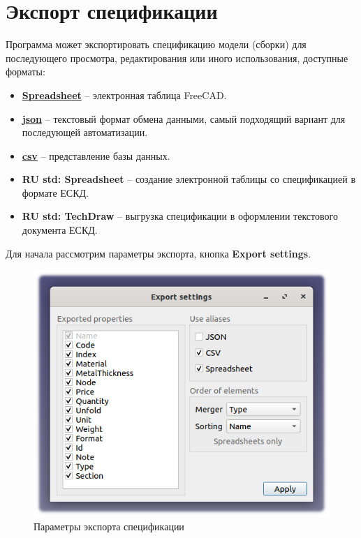 \documentclass[a4paper,12pt]{article}
\begin{document}
\pagebreak


\section{Экспорт спецификации}

Программа может экспортировать спецификацию модели (сборки) для последующего просмотра, редактирования или иного использования, доступные форматы:

\begin{itemize}
	\item \href{https://wiki.freecad.org/Spreadsheet_Workbench}{\textbf{Spreadsheet}} -- электронная таблица FreeCAD.
	\item \href{https://ru.wikipedia.org/wiki/JSON}{\textbf{json}} --  текстовый формат обмена данными, самый подходящий вариант для последующей автоматизации.
	\item \href{https://ru.wikipedia.org/wiki/CSV}{\textbf{csv}} -- представление базы данных.
	\item \textbf{RU std: Spreadsheet} -- создание электронной таблицы со спецификацией в формате ЕСКД.
	\item \textbf{RU std: TechDraw} -- выгрузка спецификации в оформлении текстового документа ЕСКД.\\
\end{itemize}

\begin{flushleft}Для начала рассмотрим параметры экспорта, кнопка \textbf{Export settings}.\end{flushleft}

\begin{figure}[htp]
	\centering
	\includegraphics[scale=1]{img/bom_export.png}
	\caption{Параметры экспорта спецификации}
	\label{sec:bom_export}
\end{figure}
\end{document}
